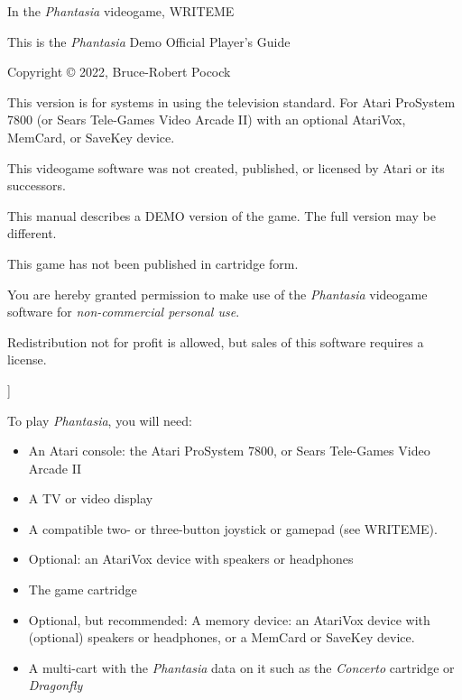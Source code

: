 \documentclass[10pt,twocolumn,openany,article]{memoir}
\begin{document}
\bigskip

In the  \textit{Phantasia} videogame, WRITEME

\vspace{1in}\vfill

This is the \textit{Phantasia} \ifdefined\DEMO Demo \else Official \fi Player's Guide

Copyright \copyright{} 2022, Bruce-Robert Pocock

\bigskip

This  version is  for systems  in \REGION{}  using the  \TV{} television
standard. For Atari ProSystem 7800 (or Sears Tele-Games Video Arcade II)
with an optional AtariVox, MemCard, or SaveKey device.

\bigskip

This videogame software was not created, published, or licensed by Atari
or its successors.

\ifdefined\DEMO
\bigskip

This manual describes  a DEMO version of the game.  The full version may
be different.

\fi

This game has not been published in cartridge form.

\bigskip

You are hereby granted permission  to make use of the \textit{Phantasia}
videogame software for \emph{non-commercial personal use}.

Redistribution not for profit is allowed, but sales of this software
requires a license.

]

\let\cleardoublepage\clearpage

\mainmatter

\tableofcontents


To play \textit{Phantasia}, you will need:

\begin{itemize}

\item An Atari console: the Atari ProSystem 7800, or Sears
  Tele-Games Video Arcade II
\item A TV or video display
\item A compatible two- or three-button joystick or gamepad (see WRITEME).

  \ifdefined\ATARIAGESAVE
\item Optional: an AtariVox device with speakers or headphones
\item The  game cartridge
  \else
\item Optional,  but recommended:  A memory  device: an  AtariVox device
  with  (optional)  speakers or  headphones,  or  a MemCard  or  SaveKey
  device.
\item A  multi-cart with the  \textit{Phantasia} data  on it such  as the
  \textit{Concerto} cartridge or \textit{Dragonfly}
  \fi
\end{itemize}
\end{document}
